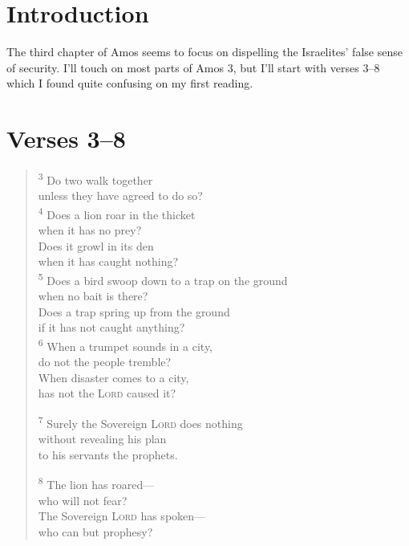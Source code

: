 \newcommand{\Date}{April 25, 2019}
\newcommand{\Title}{Bible Notes: Amos 3}



\section{Introduction}

The third chapter of Amos seems to focus on dispelling the Israelites' false
sense of security. I'll touch on most parts of Amos 3, but I'll start with
verses 3--8 which I found quite confusing on my first reading.


\section{Verses 3--8}

\begin{quote}
    \textsuperscript{3} Do two walk together\\
    \VerseIndent unless they have agreed to do so?\\
    \textsuperscript{4} Does a lion roar in the thicket\\
    \VerseIndent when it has no prey?\\
    Does it growl in its den\\
    \VerseIndent when it has caught nothing?\\
    \textsuperscript{5} Does a bird swoop down to a trap on the ground\\
    \VerseIndent when no bait is there?\\
    Does a trap spring up from the ground\\
    \VerseIndent if it has not caught anything?\\
    \textsuperscript{6} When a trumpet sounds in a city,\\
    \VerseIndent do not the people tremble?\\
    When disaster comes to a city,\\
    \VerseIndent has not the \textsc{Lord} caused it?

    \textsuperscript{7} Surely the Sovereign \textsc{Lord} does nothing\\
    \VerseIndent without revealing his plan\\
    \VerseIndent to his servants the prophets.

    \textsuperscript{8} The lion has roared---\\
    \VerseIndent who will not fear?\\
    The Sovereign \textsc{Lord} has spoken---\\
    \VerseIndent who can but prophesy?
\end{quote}

